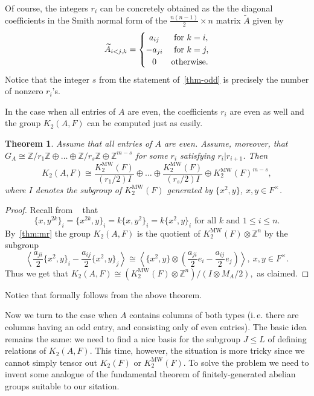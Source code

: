 \documentclass[oneside, 10pt]{amsart}
\theoremstyle{plain}
\newtheorem{thm}{Theorem}
\theoremstyle{remark}
\theoremstyle{definition}
\newcommand{\ZZ}{\mathbb{Z}}
\newcommand{\K}{K_2}
\newcommand{\Kmw}{K^{\mathrm{MW}}_2}
\begin{document}
Of course, the integers $r_i$ can be concretely obtained as the 
  the diagonal coefficients in the Smith normal form of the $\frac{n(n-1)}{2}\times n$ matrix $\widetilde{A}$ given by
\begin{equation} \label{eq:Aijk} \widetilde{A}_{i<j, k} = \left\{\def\arraystretch{1.2}%
  \begin{array}{@{}c@{\quad}l@{}}
     a_{ij} & \text{ for } k = i, \\
    -a_{ji} & \text{ for } k = j, \\
    0 & \text{otherwise.}    
  \end{array}\right.\end{equation}                    
Notice that the integer $s$ from the statement of~\cref{thm-odd} is precisely the number of nonzero $r_i$'s.
  
In the case when all entries of $A$ are even, the coefficients $r_i$ are even as well and the group $\K(A, F)$ can be computed just as easily.
\begin{thm} \label{thm-even}
  Assume that all entries of $A$ are even.
  Assume, moreover, that $G_A \cong \ZZ / r_1 \ZZ \oplus \ldots \oplus \ZZ / r_s\ZZ \oplus \ZZ^{m-s}$ for some $r_i$ satisfying $r_i | r_{i+1}$.
  Then
   \[\K(A, F) \cong \frac{\Kmw(F)}{(r_1/2) I} \oplus \ldots \oplus \frac{\Kmw(F)}{(r_s/2) I} \oplus \Kmw(F)^{m-s}, \]
    where $I$ denotes the subgroup of $\Kmw(F)$ generated by $\{x^2, y\}$, $x, y\in F^\times$.
\end{thm}
\begin{proof}
 Recall from ~\cite[Lemma~3.2]{MW} that
 \[\{x, y^{2k}\}_i = \{x^{2k}, y\}_i = k\{x,y^2\}_i = k\{x^2, y\}_i \text{ for all } k\text{ and } 1\leq i\leq n.\]
 By~\cref{thm:mr} the group $\K(A, F)$ is the quotient of
  $\Kmw(F) \otimes \ZZ^n$ by the subgroup 
  \[\left\langle \frac{a_{ji}}{2}\{x^2, y\}_i - \frac{a_{ij}}{2}\{x^2, y\}_j \right\rangle \cong \left\langle 
   \{x^2, y\} \otimes \left(\frac{a_{ji}}{2} e_i - \frac{a_{ij}}{2} e_j\right)\right\rangle,\ x,y\in F^\times. \]
 Thus we get that $\K(A, F) \cong \left(\Kmw(F) \otimes \ZZ^n\right) / (I \otimes M_A/2),$ as claimed. 
\end{proof}
Notice that \cite[Theorem~6.1]{MW} formally follows from the above theorem.

Now we turn to the case when $A$ contains columns of both types 
(i.\,e. there are columns having an odd entry, and consisting only of even entries).
The basic idea remains the same: we need to find a nice basis for the subgroup $J\leq L$ of defining relations of $\K(A, F)$.
This time, however, the situation is more tricky since we cannot simply tensor out $\K(F)$ or $\Kmw(F)$.
To solve the problem we need to invent some analogue of the fundamental theorem of finitely-generated abelian groups suitable to our sitation.
\end{document}
